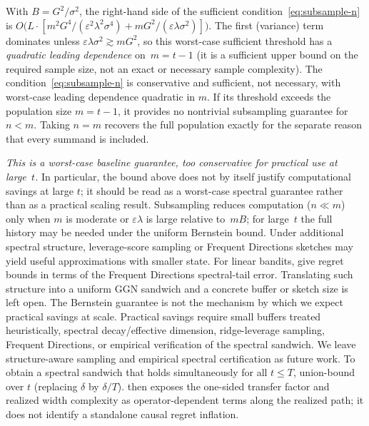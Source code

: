 \documentclass[twoside]{article}
\begin{document}
With $B=G^2/\sigma^2$, the right-hand side of the sufficient
condition~\eqref{eq:subsample-n} is
$O\!\bigl(L\cdot[m^2G^4/(\varepsilon^2\lambda^2\sigma^4)
  + mG^2/(\varepsilon\lambda\sigma^2)]\bigr)$.
The first (variance) term dominates unless
$\varepsilon\lambda\sigma^2\gtrsim mG^2$, so this worst-case sufficient threshold has
a \emph{quadratic leading dependence} on~$m=t{-}1$ (it is a sufficient upper bound on
the required sample size, not an exact or necessary sample complexity).
The condition~\eqref{eq:subsample-n} is conservative and sufficient, not
necessary, with worst-case leading dependence quadratic in $m$.  If its
threshold exceeds the population size $m=t{-}1$, it provides no nontrivial
subsampling guarantee for $n<m$.  Taking $n=m$ recovers the full population
exactly for the separate reason that every summand is included.

\emph{This is a worst-case baseline guarantee, too conservative for
practical use at large~$t$.}
In particular, the bound above does not by itself justify computational
savings at large $t$; it should be read as a worst-case spectral
guarantee rather than as a practical scaling result.
Subsampling reduces computation ($n\ll m$) only when $m$ is moderate or
$\varepsilon\lambda$ is large relative to~$mB$; for large~$t$ the full
history may be needed under the uniform Bernstein bound.
Under additional spectral structure, leverage-score sampling or Frequent
Directions sketches may yield useful approximations with smaller state.
For linear bandits, \citet{kuzborskij2019efficient} give regret bounds in terms
of the Frequent Directions spectral-tail error.  Translating such structure
into a uniform GGN sandwich and a concrete buffer or sketch size is left open.
The Bernstein guarantee is not the mechanism by which we expect
practical savings at scale.  Practical savings require small buffers
treated heuristically, spectral decay/effective dimension,
ridge-leverage sampling, Frequent Directions, or empirical verification
of the spectral sandwich.  We leave structure-aware sampling and empirical
spectral certification as future work.
To obtain a spectral sandwich that holds simultaneously for all
$t\le T$, union-bound over $t$ (replacing $\delta$ by $\delta/T$).
 then exposes the one-sided transfer factor and
realized width complexity as operator-dependent terms along the realized path;
it does not identify a standalone causal regret inflation.
\end{document}
